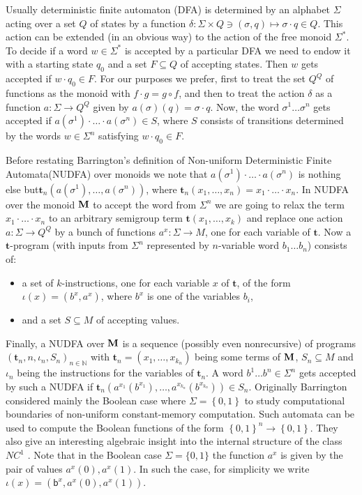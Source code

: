 \documentclass[11pt,a4paper]{amsart}
\newcommand{\m}[1]{{\uppercase {\bf{#1}}}}
\newcommand{\set}[1]{{\left\{ {#1} \right\} }}
\newcommand{\ci}{\subseteq}
\renewcommand{\mapsto}{\longmapsto}
\newcommand{\po}[1]{{\mathbf {#1}}}
\newcounter{note}
\newcommand{\map}{\longrightarrow}
\newcommand{\N}{\mathbb{N}}
\renewcommand{\b}{\textsf{b}}
\begin{document}
Usually deterministic finite automaton (DFA) is determined by 
an alphabet $\Sigma$
acting over a set $Q$ of states
by a function $\delta : \Sigma \times Q \ni (\sigma,q) \mapsto \sigma\cdot q \in Q$.
This action can be extended (in an obvious way) to the action of the free monoid $\Sigma^*$. 
To decide if a word $w\in\Sigma^*$ is accepted by a particular DFA
we need to endow it with a starting state $q_0$ and a set $F\ci Q$ of accepting states.  
Then $w$ gets accepted if $w\cdot q_0\in F$.
For our purposes we prefer, first to treat the set $Q^Q$ of functions 
as the monoid with $f\cdot g = g\circ f$, 
and then to treat the action $\delta$ as a function $a : \Sigma \map Q^Q$
given by $a(\sigma)(q)=\sigma\cdot q$.
Now, the word $\sigma^1\ldots\sigma^n$ gets accepted 
if $a(\sigma^1)\cdot\ldots\cdot a(\sigma^n)\in S$, 
where $S$ consists of transitions determined by the words $w\in\Sigma^n$ 
satisfying $w\cdot q_0\in F$.

Before restating Barrington's definition of Non-uniform Deterministic Finite Automata\break (NUDFA) over monoids \cite{Barrington86} we note that $a(\sigma^1)\cdot\ldots\cdot a(\sigma^n)$
is nothing else but\break $\po t_n(a(\sigma^1),\ldots,a(\sigma^n))$, 
where $\po t_n(x_1,\ldots,x_n)=x_1\cdot\ldots\cdot x_n$. 
In NUDFA over the monoid $\m M$ to accept the word from $\Sigma^n$ 
we are going to relax the term $x_1\cdot\ldots\cdot x_n$
to an arbitrary semigroup term $\po t(x_1,\ldots,x_k)$ 
and replace one action $a:\Sigma\map Q^Q$ by a bunch of functions $a^x:\Sigma\map M$,
one for each variable of $\po t$. 
Now a $\po t$-program (with inputs from $\Sigma^n$ represented by $n$-variable word $b_1\ldots b_n$) 
consists of:
\begin{itemize}
  \item a set of $k$-instructions, one for each variable $x$ of $\po t$, 
        of the form $\iota(x)=(b^x,a^x)$, 
        where $b^x$ is one of the variables $b_i$,
  \item and a set $S\ci M$ of accepting values.
\end{itemize}
Finally, a NUDFA over $\m M$  is a sequence (possibly even nonrecursive) of programs
$(\po t_n, n, \iota_n, S_n)_{n\in\N}$ 
with $\po t_n=(x_1,\ldots,x_{k_n})$ being some terms of $\m M$, 
$S_n \ci M$ and $\iota_n$ being the instructions for the variables of $\po t_n$. 
A word $b^1\ldots b^n\in\Sigma^n$ gets accepted by such a NUDFA if\break
$\po t_n(a^{x_1}(b^{x_1}),\ldots,a^{x_{k_n}}(b^{x_{k_n}}))\in S_n$. 
Originally Barrington considered mainly the Boolean case where $\Sigma=\set{0,1}$ 
to study computational boundaries of non-uniform constant-memory computation. 
Such automata can be used to compute the Boolean functions of the form $\set{0,1}^n\map\set{0,1}$. 
They also give an interesting algebraic insight into the internal structure of the class $NC^1$ \cite{BarringtonST90}. Note that in the Boolean case $\Sigma = \{0,1\}$ the function $a^x$ is given by the pair of values $a^x(0), a^x(1)$. In such the case,  for simplicity we write $\iota(x) = (\b^x,a^x(0),a^x(1))$.
\end{document}
